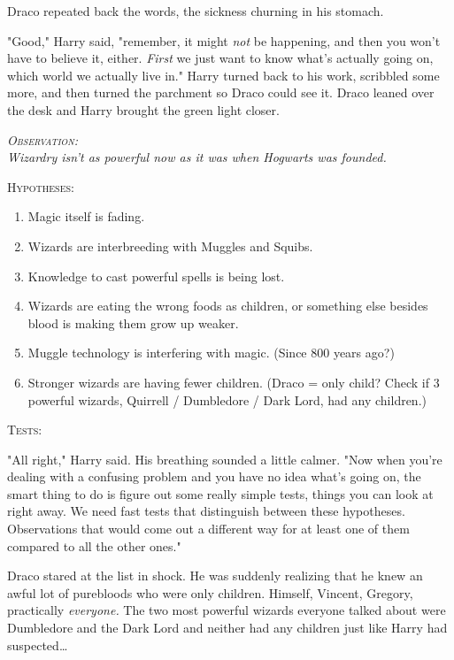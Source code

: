 Draco repeated back the words, the sickness churning in his stomach.

"Good," Harry said, "remember, it might \emph{not} be happening, and then you
won't have to believe it, either. \emph{First} we just want to know what's
actually going on, which world we actually live in." Harry turned back to his
work, scribbled some more, and then turned the parchment so Draco could see it.
Draco leaned over the desk and Harry brought the green light closer.

\begin{center}\itshape
{\scshape Observation:}\\
Wizardry isn't as powerful now as it was when Hogwarts was founded.

{\scshape Hypotheses:}
\begin{enumerate}[1.]\firmlist
\item Magic itself is fading.
\item Wizards are interbreeding with Muggles and Squibs.
\item Knowledge to cast powerful spells is being lost.
\item Wizards are eating the wrong foods as children, or something else besides
blood is making them grow up weaker.
\item Muggle technology is interfering with magic. (Since 800 years ago?)
\item Stronger wizards are having fewer children. (Draco = only child? Check if 3 
powerful wizards, Quirrell / Dumbledore / Dark Lord, had any children.)
\end{enumerate}
{\scshape Tests:}
\end{center}

"All right," Harry said. His breathing sounded a little calmer. "Now when
you're dealing with a confusing problem and you have no idea what's going on,
the smart thing to do is figure out some really simple tests, things you can
look at right away. We need fast tests that distinguish between these
hypotheses. Observations that would come out a different way for at least one
of them compared to all the other ones."

Draco stared at the list in shock. He was suddenly realizing that he knew an
awful lot of purebloods who were only children. Himself, Vincent, Gregory,
practically \emph{everyone.} The two most powerful wizards everyone talked
about were Dumbledore and the Dark Lord and neither had any children just like
Harry had suspected{\ldots}

